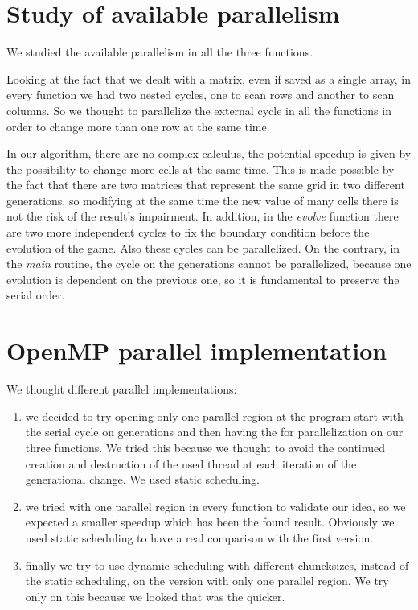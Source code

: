 \documentclass[a4paper,11pt,twoside]{report}
\begin{document}
\chapter{Study of available parallelism}

\noindent We studied the available parallelism in all the three functions. 

\noindent Looking at the fact that we dealt with a matrix, even if saved as a single array, in every function we had two nested cycles, one to scan rows and another to scan columns. So we thought to parallelize the external cycle in all the functions in order to change more than one row at the same time.

\noindent In our algorithm, there are no complex calculus, the potential speedup is given by the possibility to change more cells at the same time. This is made possible by the fact that there are two matrices that represent the same grid in two different generations, so modifying at the same time the new value of many cells there is not the risk of the result's impairment.
In addition, in the \emph{evolve} function there are two more independent cycles to fix the boundary condition before the evolution of the game. Also these cycles can be parallelized. 
On the contrary, in the \emph{main} routine, the cycle on the generations cannot be parallelized, because one evolution is dependent on the previous one, so it is fundamental to preserve the serial order. 

\chapter{OpenMP parallel implementation}
We thought different parallel implementations:
\begin{enumerate}
	\item we decided to try opening only one parallel region at the program start with the serial cycle on generations and then having the for parallelization on our three functions. We tried this because we thought to avoid the continued creation and destruction of the used thread at each iteration of the generational change. We used static scheduling.
	\item we tried with one parallel region in every function to validate our idea, so we expected a smaller speedup which has been the found result. Obviously we used static scheduling to have a real comparison with the first version.
	\item finally we try to use dynamic scheduling with different chuncksizes, instead of the static scheduling, on the version with only one parallel region. We try only on this because we looked that was the quicker.
\end{enumerate}
\end{document}

